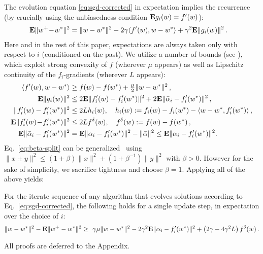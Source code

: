 The evolution equation \eqref{eq:sgd-corrected} in expectation implies the recurrence (by crucially using the unbiasedness condition ${\mathbf E} g_i(w) =f'(w)$):
\begin{align}
\E \| w^+\! -\! w^* \|^2 & %
= \| w - w^* \|^2 - 2 \gamma \langle f'(w), w-w^*\rangle + \gamma^2 \E \| g_i(w) \|^2 \,.
\label{eq:recurrence}
\end{align}
Here and in the rest of this paper, expectations are always taken only with respect to $i$ (conditioned on the past).   We utilize a number of bounds (see \cite{defazio2014}), which exploit strong convexity of $f$ (wherever $\mu$ appears) as well as Lipschitz continuity of the $f_i$-gradients (wherever $L$ appears):
\begin{align}
 \langle f'(w), w-w^* \rangle  & \ge  f(w) - f(w^*)+ \tfrac \mu 2  \| w-w^*\|^2\,,
\label{eq:naive-strong-convexity} \\
\E \|g_i(w)\|^2 & \le 2  \E \| f'_i(w) - f'_i(w^*) \|^2 + 2 \E \| \bar \alpha_i - f_i'(w^* )\|^2 \,,
\label{eq:beta-split} 
\\
%
%
\| f'_i(w) - f_i'(w^*) \|^2 & \le 2L h_i(w), \quad h_i(w)  := f_i(w) - f_i(w^*)-  \langle w-w^*, f_i'(w^*) \rangle
\label{eq:smoothness-bound}
\,, \\
\! \E \| f_i'(w) \!-\! f_i'(w^*)\|^2 & \le 2L f^\delta(w), \quad f^\delta(w) := f(w) - f(w^*) \,, 
\label{eq:expected-smoothness}
\\
\E \| \bar \alpha_i - f_i'(w^*)\|^2 & = \E \| \alpha_i - f_i'(w^*) \|^2 - \| \bar \alpha\|^2 \le \E \| \alpha_i - f_i'(w^*) \|^2 .
\label{eq:alpha-simplification}
\end{align}
%
%
Eq.~\eqref{eq:beta-split} can be generalized~\cite{defazio2014} using $\| x \pm y\|^2 \le (1+\beta) \| x\|^2 +  (1+\beta^{-1}) \|y\|^2$ with $\beta>0$. However for the sake of simplicity, we sacrifice tightness and choose $\beta=1$.
%
Applying all of the above yields:
\begin{lemma} 
\label{lemma:w-recurrence}
For the iterate sequence of any algorithm that evolves solutions according to Eq.~\eqref{eq:sgd-corrected}, the following holds for a single update step, in expectation over the choice of $i$:
\begin{equation*}
\| w - w^*\|^2  - {\mathbf E} \| w^+ - w^*\|^2 \ge \,\, \gamma \mu \| w- w^*\|^2  - 2 \gamma^2 {\mathbf E} \| \alpha_i - f_i'(w^*)\|^2  + \left( 2\gamma - 4\gamma^2 L \right) f^\delta(w) \,.
\end{equation*}
\end{lemma}
%
All proofs are deferred to the Appendix. 

